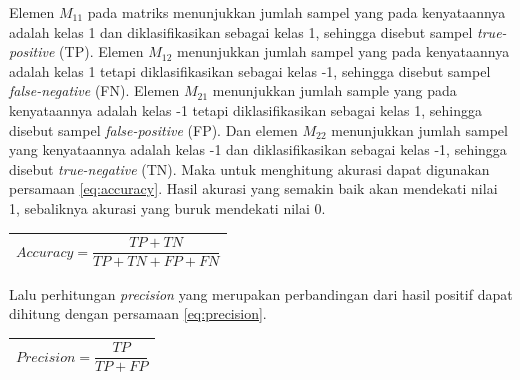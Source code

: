 \begin{adjustbox}{width=1\textwidth}
\noindent\begin{minipage}{\linewidth}
	\label{fig:ConfusionMatrix}
\end{minipage}
\end{adjustbox}

\noindent Elemen $M_{11}$ pada matriks menunjukkan jumlah sampel yang pada kenyataannya adalah kelas 1 dan diklasifikasikan sebagai kelas 1, sehingga disebut sampel \textit{true-positive} (TP). Elemen $M_{12}$ menunjukkan jumlah sampel yang pada kenyataannya adalah kelas 1 tetapi diklasifikasikan sebagai kelas -1, sehingga disebut sampel \textit{false-negative} (FN). Elemen $M_{21}$ menunjukkan jumlah sample yang pada kenyataannya adalah kelas -1 tetapi diklasifikasikan sebagai kelas 1, sehingga disebut sampel \textit{false-positive} (FP). Dan elemen $M_{22}$ menunjukkan jumlah sampel yang kenyataannya adalah kelas -1 dan diklasifikasikan sebagai kelas -1, sehingga disebut \textit{true-negative} (TN). Maka untuk menghitung akurasi dapat digunakan persamaan \ref{eq:accuracy}. Hasil akurasi yang semakin baik akan mendekati nilai 1, sebaliknya akurasi yang buruk mendekati nilai 0.
\begin{table}[H]
	\begin{adjustbox}{width=1\textwidth}
	\begin{tabular}{|p{13.55cm}|}
		\hline
		\begin{equation}
			Accuracy = \frac{TP + TN}{TP + TN + FP + FN}
			\label{eq:accuracy}
		\end{equation}\\
	\hline
	\end{tabular}
	\end{adjustbox}
\end{table}

Lalu perhitungan \textit{precision} yang merupakan perbandingan dari hasil positif dapat dihitung dengan persamaan \ref{eq:precision}.
\begin{table}[H]
	\begin{adjustbox}{width=1\textwidth}
	\begin{tabular}{|p{13.55cm}|}
		\hline
		\begin{equation}
			Precision = \frac{TP}{TP + FP}
			\label{eq:precision}
		\end{equation}\\
	\hline
	\end{tabular}
	\end{adjustbox}
\end{table}

